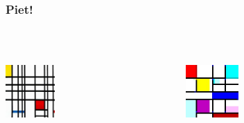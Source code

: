 \documentclass[17pt]{beamer}
\renewcommand{\(}[1]{\begin{columns}[#1]}
\renewcommand{\)}{\end{columns}}
\newcommand{\<}[1]{\begin{column}{#1}}
\renewcommand{\>}{\end{column}}
\begin{document}
\begin{frame}
  \frametitle{Piet!}
  \vspace{-1cm}
  \begin{columns}[t]
    \begin{column}{5cm}
      \begin{center}
        {\footnotesize {}}~\\~\\
        \includegraphics[height=2cm]{img/mondrian}\\~\\
      \end{center}
    \end{column}
    \begin{column}{5cm}
      \begin{center}
        {\footnotesize {}}~\\~\\
        \includegraphics[height=2cm]{img/piet}\\~\\
      \end{center}
    \end{column}
  \end{columns}
\end{frame}
\end{document}
